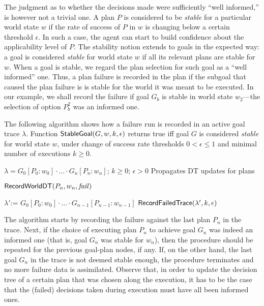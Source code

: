 The judgment as to whether the decisions made were sufficiently ``well
informed,'' is however not a trivial one.  A plan $P$ is considered to be
\emph{stable} for a particular world state $w$ if the rate of success of $P$ in
$w$ is changing below a certain threshold $\epsilon$.
In such a case, the agent can start to build confidence about the applicability
level of $P$.
The stability notion extends to goals in the expected way: a goal is considered
\emph{stable} for world state $w$ if all its relevant plans are stable for $w$. 
When a goal is stable, we regard the plan selection for such goal as a ``well
informed'' one. Thus, a plan failure is recorded in the plan if the subgoal
that caused the plan failure is is stable for the world it was meant to be
executed. In our example, we shall record the failure if goal $G_b$ is stable
in world state $w_2$---the selection of option $P_b^2$ was an informed one.

The following algorithm shows how a failure run is recorded in an active goal
trace $\lambda$. Function $\mathsf{StableGoal}(G,w,k,\epsilon)$ returns true iff goal $G$
is considered \textit{stable} for world state $w$, under change of success rate
thresholds $0 < \epsilon \leq 1$ and minimal number of executions $k \geq 0$.
 
 \renewcommand{\algorithmiccomment}[1]{\hfill \texttt{\small // #1}}
 \newcommand{\assign}{\mbox{:=\ }}
 \begin{algorithm}[h]
	\caption{$\RecordTrace(\lambda,k,\epsilon)$}\label{algo:record_failed_exec}
	\label{alg:NDS}
  \begin{algorithmic}[1]
    \REQUIRE $\lambda=G_0[P_0:w_0] \cdot \ldots \cdot G_n[P_n:w_n]$; $k\geq0$;
    $\epsilon > 0$ \ENSURE Propagates DT updates for plans

	\STATE $\mathsf{RecordWorldDT}(P_n,w_n,\mbox{\emph{fail}})$

    	 \STATE $\lambda' \assign G_0[P_0:w_0] \cdot \ldots \cdot
    				G_{n-1}[P_{n-1}:w_{n-1}]$
    	\STATE $\mathsf{RecordFailedTrace}(\lambda',k,\epsilon)$ 
    \ENDIF
  \end{algorithmic}
\end{algorithm}

 
The algorithm starts by recording the failure against the last plan $P_n$ in the
trace.
Next, if the choice of executing plan $P_n$ to achieve goal $G_n$ was indeed an
informed one (that is, goal $G_n$ was stable for $w_n$), then the procedure
should be repeated for the previous goal-plan nodes, if any.
If, on the other hand, the last goal $G_n$ in the trace is not deemed stable
enough, the procedure terminates and no more failure data is assimilated.
Observe that, in order to update the decision tree of a certain plan that was
chosen along the execution, it has to be the case that the (failed) decisions
taken during execution must have all been informed ones.


